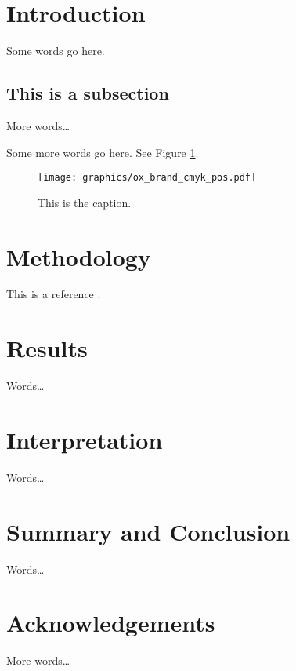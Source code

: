 \documentclass[10pt,a4paper]{article}
\begin{document}
\title{}

\author{Joe Loughry}

\maketitle

\begin{abstract}
	
\end{abstract}

\section{Introduction}

Some words go here.

\subsection{This is a subsection}

More words\ldots

\newpage

Some more words go here. See Figure \ref{figure:whatever}.

\begin{figure}[!t]
    \centering
	\texttt{[image: graphics/ox\_brand\_cmyk\_pos.pdf]}
	\caption{This is the caption.}
	\label{figure:whatever}
\end{figure}

\section{Methodology}

This is a reference \cite{Loughry2013a}.

\section{Results}

Words\ldots

\section{Interpretation}

Words\ldots

\section{Summary and Conclusion}

Words\ldots

\section{Acknowledgements}

More words\ldots



\end{document}
